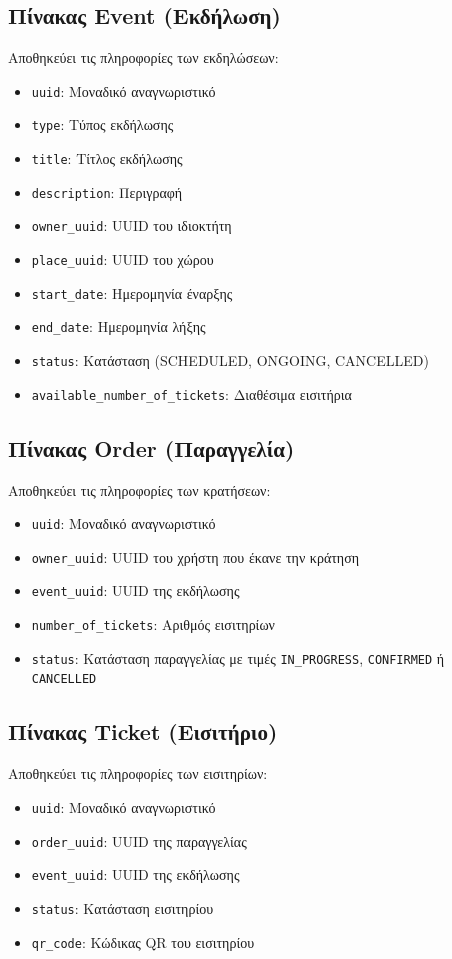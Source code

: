 \documentclass[12pt,a4paper]{report}
\begin{document}
\subsection{Πίνακας Event (Εκδήλωση)}
Αποθηκεύει τις πληροφορίες των εκδηλώσεων:
\begin{itemize}
    \item \texttt{uuid}: Μοναδικό αναγνωριστικό
    \item \texttt{type}: Τύπος εκδήλωσης
    \item \texttt{title}: Τίτλος εκδήλωσης
    \item \texttt{description}: Περιγραφή
    \item \texttt{owner\_uuid}: UUID του ιδιοκτήτη
    \item \texttt{place\_uuid}: UUID του χώρου
    \item \texttt{start\_date}: Ημερομηνία έναρξης
    \item \texttt{end\_date}: Ημερομηνία λήξης
    \item \texttt{status}: Κατάσταση (SCHEDULED, ONGOING, CANCELLED)
    \item \texttt{available\_number\_of\_tickets}: Διαθέσιμα εισιτήρια
\end{itemize}

\subsection{Πίνακας Order (Παραγγελία)}
Αποθηκεύει τις πληροφορίες των κρατήσεων:
\begin{itemize}
    \item \texttt{uuid}: Μοναδικό αναγνωριστικό
    \item \texttt{owner\_uuid}: UUID του χρήστη που έκανε την κράτηση
    \item \texttt{event\_uuid}: UUID της εκδήλωσης
    \item \texttt{number\_of\_tickets}: Αριθμός εισιτηρίων
    \item \texttt{status}: Κατάσταση παραγγελίας με τιμές \texttt{IN\_PROGRESS}, \texttt{CONFIRMED} ή \texttt{CANCELLED}
\end{itemize}

\subsection{Πίνακας Ticket (Εισιτήριο)}
Αποθηκεύει τις πληροφορίες των εισιτηρίων:
\begin{itemize}
    \item \texttt{uuid}: Μοναδικό αναγνωριστικό
    \item \texttt{order\_uuid}: UUID της παραγγελίας
    \item \texttt{event\_uuid}: UUID της εκδήλωσης
    \item \texttt{status}: Κατάσταση εισιτηρίου
    \item \texttt{qr\_code}: Κώδικας QR του εισιτηρίου
\end{itemize}
\end{document}
